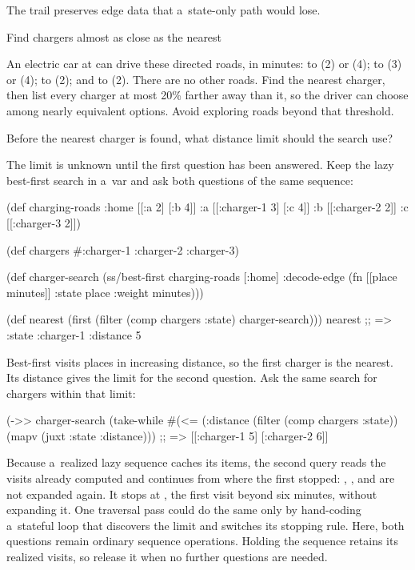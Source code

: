 {{The trail preserves edge data that a~state-only path would lose.

\secc Find chargers almost as close as the nearest

 An electric car at  can drive these
directed roads, in minutes:  to  (2) or  (4);
 to  (3) or  (4);  to
 (2); and  to  (2). There are no
other roads. Find the nearest charger, then list every charger at most 20\%
farther away than it, so the driver can choose among nearly equivalent
options. Avoid exploring roads beyond that threshold.

\smallskip
{} Before the nearest charger is found, what distance
limit should the search use?

\smallskip
{} The limit is unknown until the first question has
been answered. Keep the lazy best-first search in a~var and ask both
questions of the same sequence:

\begtt {}
(def charging-roads
  {:home [[:a 2] [:b 4]]
   :a    [[:charger-1 3] [:c 4]]
   :b    [[:charger-2 2]]
   :c    [[:charger-3 2]]})

(def chargers #{:charger-1 :charger-2 :charger-3})

(def charger-search
  (ss/best-first charging-roads
                 [:home]
                 {:decode-edge (fn [[place minutes]]
                                 {:state place :weight minutes})}))

(def nearest
  (first (filter (comp chargers :state) charger-search)))
nearest
;; => {:state :charger-1 :distance 5}
\endtt

Best-first visits places in increasing distance, so the first charger is
the nearest. Its distance gives the limit for the second question. Ask the
same search for chargers within that limit:

\begtt {}
(->> charger-search
     (take-while #(<= (:distance %
     (filter (comp chargers :state))
     (mapv (juxt :state :distance)))
;; => [[:charger-1 5] [:charger-2 6]]
\endtt

Because a~realized lazy sequence caches its items, the second query reads
the visits already computed and continues from where the first stopped:
, , and  are not expanded again. It stops at , the first visit beyond six
minutes, without expanding it. One traversal pass could do the same only
by hand-coding a~stateful loop that discovers the limit and switches its
stopping rule. Here, both questions remain ordinary sequence operations.
Holding the sequence retains its realized visits, so release it when no
further questions are needed.

}}
